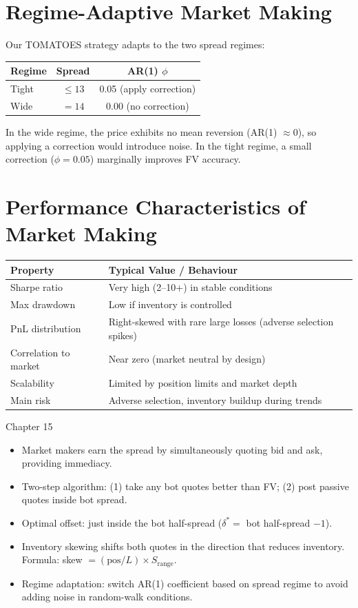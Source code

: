 \documentclass[12pt,a4paper,openany]{report}
\theoremstyle{definition}
\begin{document}
\section{Regime-Adaptive Market Making}

Our TOMATOES strategy adapts to the two spread regimes:
\begin{center}
\begin{tabular}{lcc}
\toprule
\textbf{Regime} & \textbf{Spread} & \textbf{AR(1) $\phi$} \\
\midrule
Tight & $\leq 13$ & 0.05 (apply correction) \\
Wide  & $= 14$   & 0.00 (no correction) \\
\bottomrule
\end{tabular}
\end{center}
In the wide regime, the price exhibits no mean reversion (AR(1) $\approx 0$), so applying a correction would introduce noise. In the tight regime, a small correction ($\phi = 0.05$) marginally improves FV accuracy.

\section{Performance Characteristics of Market Making}

\begin{center}
\begin{tabular}{ll}
\toprule
\textbf{Property} & \textbf{Typical Value / Behaviour} \\
\midrule
Sharpe ratio & Very high (2--10+) in stable conditions \\
Max drawdown & Low if inventory is controlled \\
PnL distribution & Right-skewed with rare large losses (adverse selection spikes) \\
Correlation to market & Near zero (market neutral by design) \\
Scalability & Limited by position limits and market depth \\
Main risk & Adverse selection, inventory buildup during trends \\
\bottomrule
\end{tabular}
\end{center}

\begin{takeawaybox}{Chapter 15}
\begin{itemize}
  \item Market makers earn the spread by simultaneously quoting bid and ask, providing immediacy.
  \item Two-step algorithm: (1) take any bot quotes better than FV; (2) post passive quotes inside bot spread.
  \item Optimal offset: just inside the bot half-spread ($\delta^* = $ bot half-spread $- 1$).
  \item Inventory skewing shifts both quotes in the direction that reduces inventory. Formula: skew $= (\text{pos}/L) \times S_{\text{range}}$.
  \item Regime adaptation: switch AR(1) coefficient based on spread regime to avoid adding noise in random-walk conditions.
\end{itemize}
\end{takeawaybox}
\end{document}
